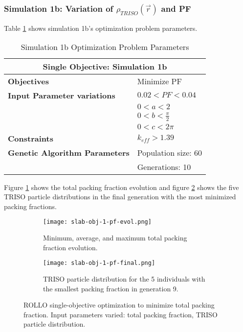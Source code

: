 \subsubsection{Simulation 1b: Variation of $\rho_{TRISO}(\vec{r})$ and PF}
Table \ref{tab:simulation1b} shows simulation 1b's optimization problem parameters. 
\begin{table}[H]
    \centering
    \onehalfspacing
    \caption{Simulation 1b Optimization Problem Parameters}
	\label{tab:simulation1b}
    \footnotesize
    \begin{tabular}{l|p{3cm}}
    \hline 
    \multicolumn{2}{c}{\textbf{Single Objective: Simulation 1b}} \\
    \hline 
    \textbf{Objectives} & Minimize PF \\
    \hline 
    \textbf{Input Parameter variations} & $0.02<PF<0.04$ \\
    & $0<a<2$ \\
    & $0<b<\frac{\pi}{2}$ \\
    & $0<c<2\pi$ \\
    \hline
    \textbf{Constraints} & $k_{eff} > 1.39$\\ 
    \hline 
    \textbf{Genetic Algorithm Parameters} & Population size: 60 \\
    & Generations: 10 \\
    \hline
    \end{tabular}
\end{table}
Figure \ref{fig:slab-obj-1-pf-evol} shows the total packing fraction evolution and 
figure \ref{fig:slab-obj-1-pf-final} shows the five TRISO particle distributions in 
the final generation with the most minimized packing fractions. 
\begin{figure}[]
    \centering
    \begin{subfigure}{\textwidth}
        \texttt{[image: slab-obj-1-pf-evol.png]}
        \caption{Minimum, average, and maximum total packing fraction evolution.}
        \label{fig:slab-obj-1-pf-evol} 
    \end{subfigure}
    \begin{subfigure}{\textwidth}
        \texttt{[image: slab-obj-1-pf-final.png]}
        \caption{TRISO particle distribution for the 5 individuals with the 
        smallest packing fraction in generation 9.}
        \label{fig:slab-obj-1-pf-final} 
    \end{subfigure}
    \caption{ROLLO single-objective optimization to minimize total packing fraction. 
    Input parameters varied: total packing fraction, TRISO particle distribution.}
    \label{fig:slab-obj-1-pf}
\end{figure}
